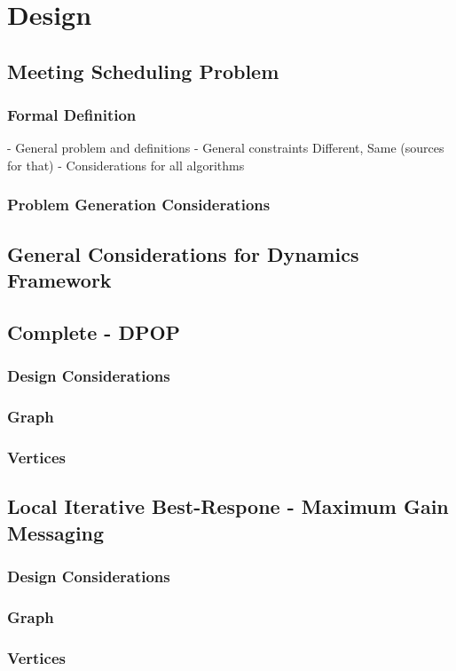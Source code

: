 \chapter{Design}
\section{Meeting Scheduling Problem}
\subsection{Formal Definition}
- General problem and definitions
- General constraints Different, Same (sources for that)
- Considerations for all algorithms
\subsection{Problem Generation Considerations}

\section{General Considerations for Dynamics Framework}

\section{Complete - DPOP}
\subsection{Design Considerations}
\subsection{Graph}
\subsection{Vertices}


\section{Local Iterative Best-Respone - Maximum Gain Messaging}
\subsection{Design Considerations}
\subsection{Graph}
\subsection{Vertices}



